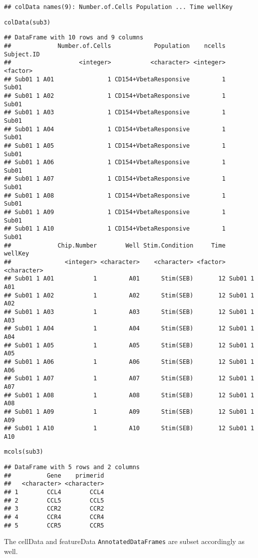 \documentclass{article}\usepackage[]{graphicx}\usepackage[usenames,dvipsnames]{color}
\newcommand{\hlstd}[1]{\textcolor[rgb]{0.251,0.251,0.251}{#1}}%
\newcommand{\hlkwd}[1]{\textcolor[rgb]{0.878,0.439,0.125}{#1}}%
\newenvironment{knitrout}{}{} %
\begin{document}
\begin{knitrout}
\begin{kframe}
\begin{verbatim}
## colData names(9): Number.of.Cells Population ... Time wellKey
\end{verbatim}
\begin{alltt}
\hlkwd{colData}\hlstd{(sub3)}
\end{alltt}
\begin{verbatim}
## DataFrame with 10 rows and 9 columns
##             Number.of.Cells            Population    ncells Subject.ID
##                   <integer>           <character> <integer>   <factor>
## Sub01 1 A01               1 CD154+VbetaResponsive         1      Sub01
## Sub01 1 A02               1 CD154+VbetaResponsive         1      Sub01
## Sub01 1 A03               1 CD154+VbetaResponsive         1      Sub01
## Sub01 1 A04               1 CD154+VbetaResponsive         1      Sub01
## Sub01 1 A05               1 CD154+VbetaResponsive         1      Sub01
## Sub01 1 A06               1 CD154+VbetaResponsive         1      Sub01
## Sub01 1 A07               1 CD154+VbetaResponsive         1      Sub01
## Sub01 1 A08               1 CD154+VbetaResponsive         1      Sub01
## Sub01 1 A09               1 CD154+VbetaResponsive         1      Sub01
## Sub01 1 A10               1 CD154+VbetaResponsive         1      Sub01
##             Chip.Number        Well Stim.Condition     Time     wellKey
##               <integer> <character>    <character> <factor> <character>
## Sub01 1 A01           1         A01      Stim(SEB)       12 Sub01 1 A01
## Sub01 1 A02           1         A02      Stim(SEB)       12 Sub01 1 A02
## Sub01 1 A03           1         A03      Stim(SEB)       12 Sub01 1 A03
## Sub01 1 A04           1         A04      Stim(SEB)       12 Sub01 1 A04
## Sub01 1 A05           1         A05      Stim(SEB)       12 Sub01 1 A05
## Sub01 1 A06           1         A06      Stim(SEB)       12 Sub01 1 A06
## Sub01 1 A07           1         A07      Stim(SEB)       12 Sub01 1 A07
## Sub01 1 A08           1         A08      Stim(SEB)       12 Sub01 1 A08
## Sub01 1 A09           1         A09      Stim(SEB)       12 Sub01 1 A09
## Sub01 1 A10           1         A10      Stim(SEB)       12 Sub01 1 A10
\end{verbatim}
\begin{alltt}
\hlkwd{mcols}\hlstd{(sub3)}
\end{alltt}
\begin{verbatim}
## DataFrame with 5 rows and 2 columns
##          Gene    primerid
##   <character> <character>
## 1        CCL4        CCL4
## 2        CCL5        CCL5
## 3        CCR2        CCR2
## 4        CCR4        CCR4
## 5        CCR5        CCR5
\end{verbatim}
\end{kframe}
\end{knitrout}
The cellData and featureData \texttt{AnnotatedDataFrames} are subset
accordingly as well.
\end{document}
